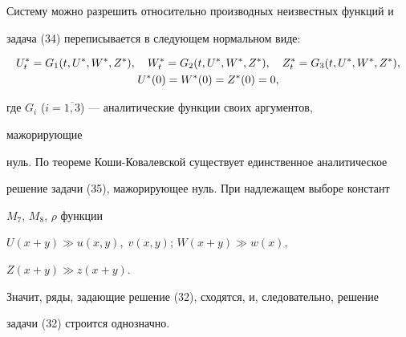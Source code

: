 Систему можно разрешить относительно производных неизвестных функций и


задача (34) переписывается в следующем нормальном виде:


\begin{gather}


U^*_t=G_1(t,U^*,W^*,Z^*),\quad


W^*_t=G_2(t,U^*,W^*,Z^*),\quad


Z^*_t=G_3(t,U^*,W^*,Z^*),\\


U^*(0)=W^*(0)=Z^*(0)=0,\notag


\end{gather}


где $G_i$ ($i=\overline{1,3}$) --- аналитические функции своих аргументов,


мажорирующие


нуль. По теореме Коши-Ковалевской существует единственное аналитическое


решение задачи (35), мажорирующее нуль. При надлежащем выборе констант


$M_7$, $M_8$, $\rho$ функции


$U(x+y)\gg u(x,y),\;v(x,y)$; $W(x+y)\gg w(x)$,


$Z(x+y)\gg z(x+y)$.





Значит, ряды, задающие решение (32), сходятся, и, следовательно, решение


задачи (32) строится однозначно.





